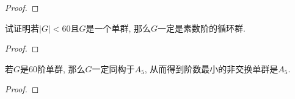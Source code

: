 \begin{proof}
    
\end{proof}

\begin{problem}
    试证明若$|G| < 60$且$G$是一个单群, 那么$G$一定是素数阶的循环群.
\end{problem}

\begin{proof}
    
\end{proof}

\begin{problem}
    若$G$是$60$阶单群, 那么$G$一定同构于$A_5$, 从而得到阶数最小的非交换单群是$A_5$.
\end{problem}

\begin{proof}
    
\end{proof}